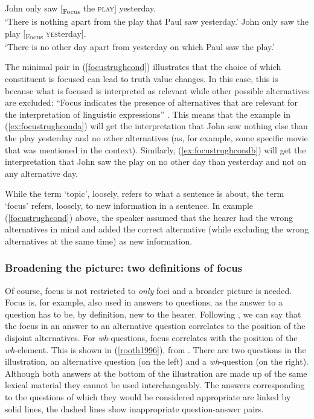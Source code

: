 \begin{exe}
\ex\label{focustrughcond}
\begin{xlist} 
\ex John only saw $[$\textsubscript{Focus} the \textsc{play}$]$ yesterday. \\
`There is nothing apart from the play that Paul saw yesterday.'\label{ex:focustrughconda}
\ex John only saw the play $[$\textsubscript{Focus} \textsc{yes}terday$]$. \\
`There is no other day apart from yesterday on which Paul saw the play.'\label{ex:focustrughcondb}
\end{xlist}
\end{exe}

\noindent The minimal pair in (\ref{focustrughcond}) illustrates that the choice of which constituent is focused can lead to truth value changes. In this case, this is because what is focused is interpreted as relevant while other possible alternatives are excluded: ``Focus indicates the presence of alternatives that are relevant for the interpretation of linguistic expressions'' \citep[18]{krifka2007basic}. This means that the example in (\ref{ex:focustrughconda}) will get the interpretation that John saw nothing else than the play yesterday and no other alternatives (as, for example, some specific movie that was mentioned in the context). Similarly, (\ref{ex:focustrughcondb}) will get the interpretation that John saw the play on no other day than yesterday and not on any alternative day. 

While the term `topic', loosely, refers to what a sentence is about, the term `focus' refers, loosely, to new information in a sentence. In example (\ref{focustrughcond}) above, the speaker assumed that the hearer had the wrong alternatives in mind and added the correct alternative (while excluding the wrong alternatives at the same time) as new information. 

\subsubsection{Broadening the picture: two definitions of focus}
Of course, focus is not restricted to \textit{only} foci and a broader picture is needed. Focus is, for example, also used in answers to questions, as the answer to a question has to be, by definition, new to the hearer. Following \citet{rooth1996focus}, we can say that the focus in an answer to an alternative question correlates to the position of the disjoint alternatives. For \textit{wh}-questions, focus correlates with the position of the \textit{wh}-element. This is shown in (\ref{rooth1996}), from \citet{rooth1996focus}. There are two questions in the illustration, an alternative question (on the left) and a \textit{wh}-question (on the right). Although both answers at the bottom of the illustration are made up of the same lexical material they cannot be used interchangeably. The answers corresponding to the questions of which they would be considered appropriate are linked by solid lines, the dashed lines show inappropriate question-answer pairs. 


